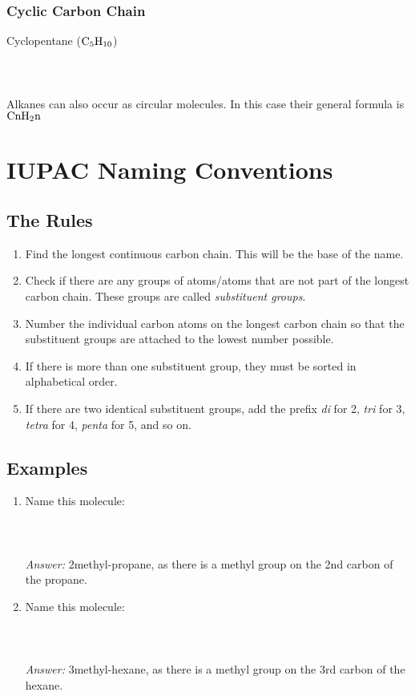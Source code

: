 \documentclass[11pt,twoside]{article}
\begin{document}
				\subsubsection{Cyclic Carbon Chain}
					Cyclopentane ($\ce{C5H10}$) \\ \\
					{\scriptsize {}} \\ \\
					Alkanes can also occur as circular molecules. In this case their general formula is $\ce{CnH2n}$

	\section{IUPAC Naming Conventions}
		\subsection{The Rules}
			\begin{enumerate}
				\item{Find the longest continuous carbon chain. This will be the base of the name.}
				\item{Check if there are any groups of atoms/atoms that are not part of the longest carbon chain. These groups are called \emph{substituent groups}.}
				\item{Number the individual carbon atoms on the longest carbon chain so that the substituent groups are attached to the lowest number possible.}
				\item{If there is more than one substituent group, they must be sorted in alphabetical order.}
				\item{If there are two identical substituent groups, add the prefix \emph{di} for 2, \emph{tri} for 3, \emph{tetra} for 4, \emph{penta} for 5, and so on.}
			\end{enumerate}
		\subsection{Examples}
			\begin{enumerate}
				\item{Name this molecule: \\ \\ {\scriptsize {}} \\ \\ \emph{Answer:} 2methyl-propane, as there is a methyl group on the 2nd carbon of the propane.}
				\item{Name this molecule: \\ \\ {\scriptsize {}} \\ \\ \emph{Answer:} 3methyl-hexane, as there is a methyl group on the 3rd carbon of the hexane.}
			\end{enumerate}
			
\end{document}
